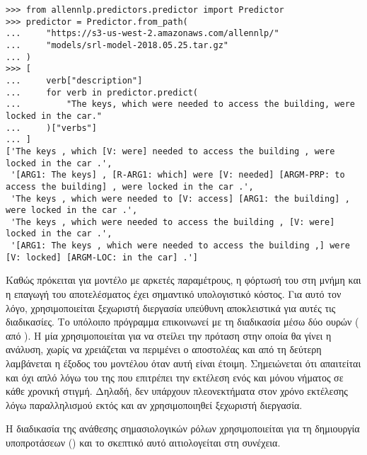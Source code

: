\begin{listing}
    \begin{verbatim}
>>> from allennlp.predictors.predictor import Predictor
>>> predictor = Predictor.from_path(
...     "https://s3-us-west-2.amazonaws.com/allennlp/"
...     "models/srl-model-2018.05.25.tar.gz"
... )
>>> [
...     verb["description"]
...     for verb in predictor.predict(
...         "The keys, which were needed to access the building, were locked in the car."
...     )["verbs"]
... ]
['The keys , which [V: were] needed to access the building , were locked in the car .',
 '[ARG1: The keys] , [R-ARG1: which] were [V: needed] [ARGM-PRP: to access the building] , were locked in the car .',
 'The keys , which were needed to [V: access] [ARG1: the building] , were locked in the car .',
 'The keys , which were needed to access the building , [V: were] locked in the car .',
 '[ARG1: The keys , which were needed to access the building ,] were [V: locked] [ARGM-LOC: in the car] .']
\end{verbatim}
    \label{lst:srl}
\end{listing}

Καθώς πρόκειται για μοντέλο με αρκετές παραμέτρους, η φόρτωσή του στη μνήμη και η επαγωγή του αποτελέσματος έχει σημαντικό υπολογιστικό κόστος.
Για αυτό τον λόγο, χρησιμοποιείται ξεχωριστή διεργασία υπεύθυνη αποκλειστικά για αυτές τις διαδικασίες.
Το υπόλοιπο πρόγραμμα επικοινωνεί με τη διαδικασία μέσω δύο ουρών ( από ).
Η μία χρησιμοποιείται για να στείλει την πρόταση στην οποία θα γίνει η ανάλυση, χωρίς να χρειάζεται να περιμένει ο αποστολέας και από τη δεύτερη λαμβάνεται η έξοδος του μοντέλου όταν αυτή είναι έτοιμη.
Σημειώνεται ότι απαιτείται  και όχι απλό 
λόγω του  της  που επιτρέπει την εκτέλεση ενός και μόνου νήματος σε κάθε χρονική στιγμή.
Δηλαδή, δεν υπάρχουν πλεονεκτήματα στον χρόνο εκτέλεσης λόγω παραλληλισμού εκτός και αν χρησιμοποιηθεί ξεχωριστή διεργασία.

Η διαδικασία της ανάθεσης σημασιολογικών ρόλων χρησιμοποιείται για τη δημιουργία υποπροτάσεων () και το σκεπτικό αυτό αιτιολογείται στη συνέχεια.

